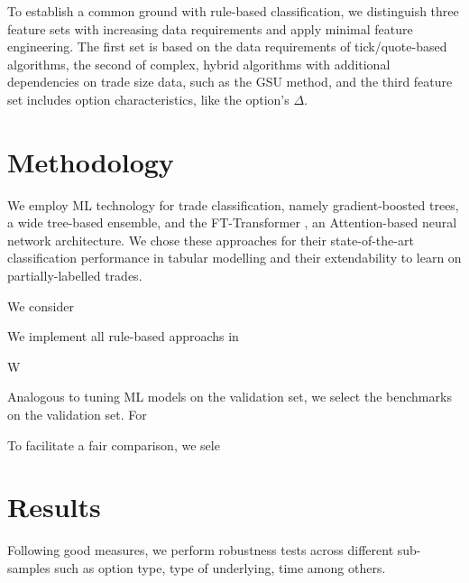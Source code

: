To establish a common ground with rule-based classification, we distinguish three feature sets with increasing data requirements and apply minimal feature engineering. The first set is based on the data requirements of tick/quote-based algorithms, the second of complex, hybrid algorithms with additional dependencies on trade size data, such as the \gls{GSU} method, and the third feature set includes option characteristics, like the option's $\Delta$. 

\section{Methodology}

We employ ML technology for trade classification, namely gradient-boosted trees, a wide tree-based ensemble, and the FT-Transformer \autocite{gorishniyRevisitingDeepLearning2021}, an Attention-based neural network architecture. We chose these approaches for their state-of-the-art classification performance in tabular modelling \autocites[][]{gorishniyRevisitingDeepLearning2021}[][]{grinsztajnWhyTreebasedModels2022} and their extendability to learn on partially-labelled trades.



We consider 


We implement all rule-based approachs in 


W

Analogous to tuning ML models on the validation set, we select the benchmarks on the validation set. For 


To facilitate a fair comparison, we sele


\section{Results}

Following good measures, we perform robustness tests across different sub-samples such as option type, type of underlying, time among others. 


